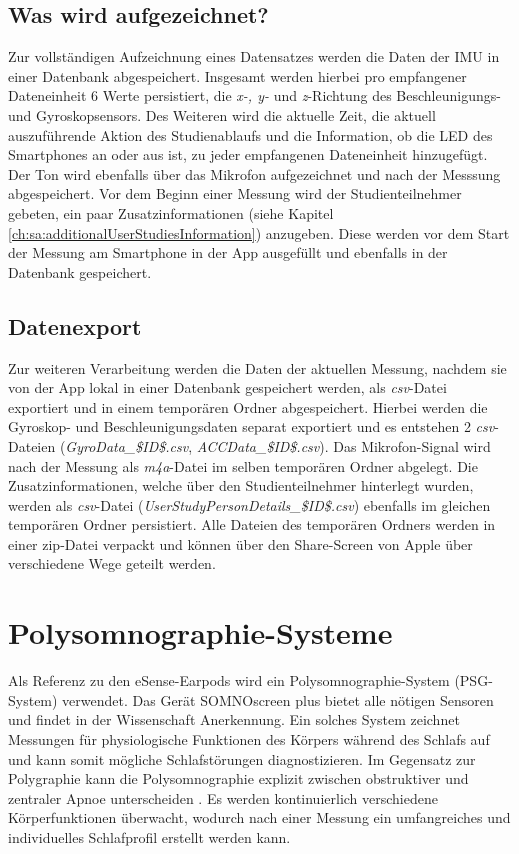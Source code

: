 \subsection{Was wird aufgezeichnet?}
\label{ch:sa:ep:what_to_record}
Zur vollständigen Aufzeichnung eines Datensatzes werden die Daten der IMU in einer Datenbank abgespeichert.
Insgesamt werden hierbei pro empfangener Dateneinheit 6 Werte persistiert, die \textit{x-, y-} und \textit{z}-Richtung des Beschleunigungs- und Gyroskopsensors. 
Des Weiteren wird die aktuelle Zeit, die aktuell auszuführende Aktion des Studienablaufs und die Information, ob die LED des Smartphones an oder aus ist, zu jeder empfangenen Dateneinheit hinzugefügt.
Der Ton wird ebenfalls über das Mikrofon aufgezeichnet und nach der Messsung abgespeichert.
Vor dem Beginn einer Messung wird der Studienteilnehmer gebeten, ein paar Zusatzinformationen (siehe Kapitel \ref{ch:sa:additionalUserStudiesInformation}) anzugeben.
Diese werden vor dem Start der Messung am Smartphone in der App ausgefüllt und ebenfalls in der Datenbank gespeichert.

\subsection{Datenexport}
\label{ch:sa:ep:export}
Zur weiteren Verarbeitung werden die Daten der aktuellen Messung, nachdem sie von der App lokal in einer Datenbank gespeichert werden, als \textit{csv}-Datei exportiert und in einem temporären Ordner abgespeichert.
Hierbei werden die Gyroskop- und Beschleunigungsdaten separat exportiert und es entstehen 2 \textit{csv}-Dateien (\glqq \textit{GyroData\_\$ID\$.csv}\grqq, \glqq \textit{ACCData\_\$ID\$.csv}\grqq).
Das Mikrofon-Signal wird nach der Messung als \textit{m4a}-Datei im selben temporären Ordner abgelegt.
Die Zusatzinformationen, welche über den Studienteilnehmer hinterlegt wurden, werden als \textit{csv}-Datei (\glqq \textit{UserStudyPersonDetails\_\$ID\$.csv}\grqq) ebenfalls im gleichen temporären Ordner persistiert.
Alle Dateien des temporären Ordners werden in einer zip-Datei verpackt und können über den Share-Screen von Apple über verschiedene Wege geteilt werden.

\section{Polysomnographie-Systeme}
\label{ch:sa:psg}
Als Referenz zu den eSense-Earpods wird ein Polysomnographie-System (PSG-System) verwendet. 
Das Gerät SOMNOscreen{\texttrademark} plus bietet alle nötigen Sensoren und findet in der Wissenschaft Anerkennung.
Ein solches System zeichnet Messungen für physiologische Funktionen des Körpers während des Schlafs auf und kann somit mögliche Schlafstörungen diagnostizieren.
Im Gegensatz zur Polygraphie kann die Polysomnographie explizit zwischen obstruktiver und zentraler Apnoe unterscheiden \cite{croenleinSchlafmedizin1x1Praxisorientiertes2017}.
Es werden kontinuierlich verschiedene Körperfunktionen überwacht, wodurch nach einer Messung ein umfangreiches und individuelles Schlafprofil erstellt werden kann.

